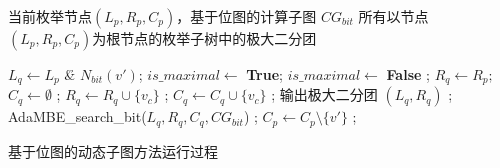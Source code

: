 \begin{algorithm} [H]
  \begin{algorithmic}[1]
    \normalsize
    \REQUIRE 当前枚举节点$(L_p, R_p, C_p)$，基于位图的计算子图 $CG_{bit}$
    \ENSURE 所有以节点$(L_p, R_p, C_p)$为根节点的枚举子树中的极大二分团


    \renewcommand{\algorithmicwhile}{\textbf{procedure}}
    \renewcommand{\algorithmicdo}{\textbf{:}}
    
      \STATE $L_q \leftarrow L_p$ \h{\&} $N_{bit}(v')$;
      \STATE $is\_maximal \leftarrow$ \textbf{True};
          \STATE $is\_maximal \leftarrow$ \textbf{False} ;
        \ENDIF
      \ENDFOR
        \STATE $R_q \leftarrow R_p;$ $C_q \leftarrow \emptyset$ ;
            \STATE $R_q \leftarrow R_q \cup \{v_c\}$ ;
            \STATE $C_q \leftarrow C_q \cup \{v_c\}$ ;
          \ENDIF
        \ENDFOR
        \STATE 输出极大二分团 $(L_q, R_q)$ ;
        \STATE \textsf{AdaMBE\_search\_bit}($L_q, R_q, C_q, CG_{bit}$) ;
      \ENDIF
      \STATE $C_p \leftarrow C_p \setminus \{v'\} $ ;
    \ENDFOR
    \ENDWHILE

  \end{algorithmic}
  \caption{基于位图的动态子图方法运行过程}
  \label{alg:adambe_bit}
\end{algorithm}


